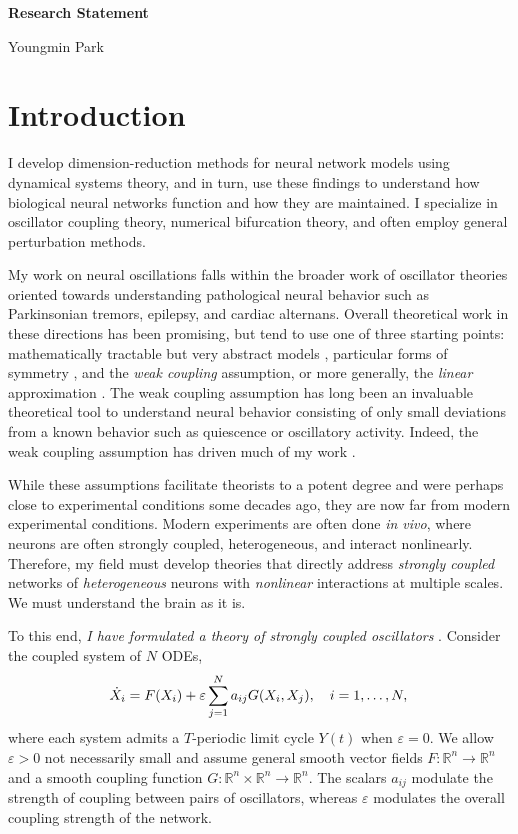 \documentclass[a4paper,11pt]{article}
\newcommand{\ve}{\varepsilon}
\begin{document}
\begin{center}
\Large \textbf{Research Statement}

\Large Youngmin Park
\end{center}


\section{Introduction}

I develop dimension-reduction methods for neural network models using dynamical systems theory, and in turn, use these findings to understand how biological neural networks function and how they are maintained. I specialize in  oscillator coupling theory, numerical bifurcation theory, and often employ general perturbation methods.

My work on neural oscillations falls within the broader work of oscillator theories oriented towards understanding pathological neural behavior such as Parkinsonian tremors, epilepsy, and cardiac alternans. Overall theoretical work in these directions has been promising, but tend to use one of three starting points: mathematically tractable but very abstract models \cite{ott2008low}, particular forms of symmetry \cite{golubitsky1986hopf}, and the \textit{weak coupling} assumption, or more generally, the \textit{linear} approximation \cite{ermentrout2002modeling}. The weak coupling assumption has long been an invaluable theoretical tool to understand neural behavior consisting of only small deviations from a known behavior such as quiescence or oscillatory activity. Indeed, the weak coupling assumption has driven much of my work \cite{park2016weakly,park2018multiple,park2018scalar}. 

While these assumptions facilitate theorists to a potent degree and were perhaps close to experimental conditions some decades ago, they are now far from modern experimental conditions. Modern experiments are often done \textit{in vivo}, where neurons are often strongly coupled, heterogeneous, and interact nonlinearly. Therefore, my field must develop theories that directly address \textit{strongly coupled} networks of \textit{heterogeneous} neurons with \textit{nonlinear} interactions at multiple scales. We must understand the brain as it is.

To this end, \textit{I have formulated a theory of strongly coupled oscillators} \cite{park2020high}. Consider the coupled system of $N$ ODEs,
\begin{equation}\label{eq:odes}
\dot X_i = F(X_i) +\ve \sum_{j=1}^N a_{ij} G(X_i,X_j), \quad i=1,\ldots,N,\\
\end{equation}
where each system admits a $T$-periodic limit cycle $Y(t)$ when $\ve=0$. We allow $\ve>0$ not necessarily small and assume general smooth vector fields $F:\mathbb{R}^n \rightarrow \mathbb{R}^n$ and a smooth coupling function $G:\mathbb{R}^n\times\mathbb{R}^n\rightarrow \mathbb{R}^n$. The scalars $a_{ij}$ modulate the strength of coupling between pairs of oscillators, whereas $\ve$ modulates the overall coupling strength of the network.
\end{document}
